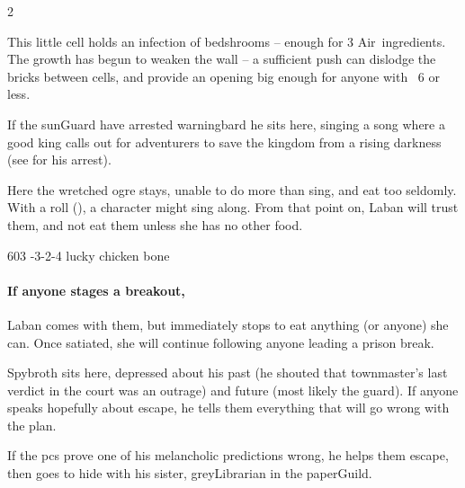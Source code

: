 \begin{multicols}{2}



This little cell holds an infection of \glspl{bedshroom} -- enough for 3 Air~\glspl{ingredient}.
The growth has begun to weaken the wall -- a sufficient push can dislodge the bricks between cells, and provide an opening big enough for anyone with ~6 or less.


If the \gls{sunGuard} have arrested \gls{warningbard} he sits here, singing a
song where a good king calls out for adventurers to save the kingdom from a
rising darkness (see  for his arrest).


Here the wretched \gls{ogre} stays, unable to do more than sing, and eat too seldomly.
With a  roll (\tn[5]), a character might sing along.
From that point on, Laban will trust them, and not eat them unless she has no other food.

%
  {{6}{0}{3}}%
  {{-3}{-2}{-4}}%
  {%
  }%
  {}%
  {lucky chicken bone}%
  {}%

\paragraph{If anyone stages a breakout,}
Laban comes with them, but immediately stops to eat anything (or anyone) she can.
Once satiated, she will continue following anyone leading a prison break.


Spybroth sits here, depressed about his past (he shouted that \gls{townmaster}'s last verdict in the \gls{court} was an outrage) and future (most likely the \gls{guard}).
If anyone speaks hopefully about escape, he tells them everything that will go wrong with the plan.

If the \glspl{pc} prove one of his melancholic predictions wrong, he helps them escape, then goes to hide with his sister, \gls{greyLibrarian} in the \gls{paperGuild}.



\end{multicols}
